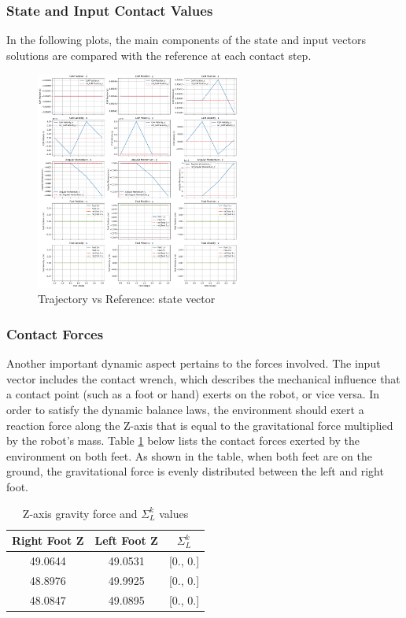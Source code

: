 \documentclass[main.tex]{subfiles}
\begin{document}
\subsubsection*{State and Input Contact Values}
In the following plots, the main components of the state and input vectors solutions are compared with the reference at each contact step.
\begin{figure}[htbp]
    \centering
    \includegraphics[width=0.6\textwidth]{figures/contact_x_still.png}
    \caption{Trajectory vs Reference: state vector}
    \label{fig:contact_x_still}
\end{figure}

\subsubsection*{Contact Forces}
Another important dynamic aspect pertains to the forces involved. The input vector includes the contact wrench, which describes the mechanical influence that a contact point (such as a foot or hand) exerts on the robot, or vice versa.
In order to satisfy the dynamic balance laws, the environment should exert a reaction force along the Z-axis that is equal to the gravitational force multiplied by the robot's mass. Table \ref{tab:contact_forces_still} below lists the contact forces exerted by the environment on both feet. As shown in the table, when both feet are on the ground, the gravitational force is evenly distributed between the left and right foot.
\begin{table}[H]
\label{tab:contact_forces_still}
\centering
\begin{tabular}{ccc}
\toprule
Right Foot Z & Left Foot Z & $\Sigma_L^k$ \\
\midrule
49.0644 & 49.0531 & [0., 0.] \\
48.8976 & 49.9925 & [0., 0.] \\
48.0847 & 49.0895 & [0., 0.] \\
\bottomrule
\end{tabular}
\caption{Z-axis gravity force and $\Sigma_L^k$ values}
\end{table}
\end{document}
